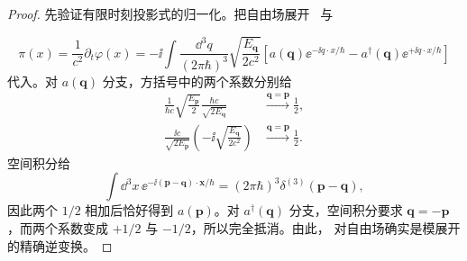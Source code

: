 \begin{proof}
先验证有限时刻投影式的归一化。把自由场展开~ 与

\begin{equation*}
 \pi(x)=\frac{1}{c^2}\partial_t\varphi(x)
 =-\ii\int\frac{\dd^3 q}{(2\pi\hbar)^3}
 \sqrt{\frac{E_{\mathbf q}}{2c^2}}
 \left[
 a(\mathbf q)\ee^{-\ii q\cdot x/\hbar}
 -a^\dagger(\mathbf q)\ee^{+\ii q\cdot x/\hbar}
 \right]
\end{equation*}
代入。对 $a(\mathbf q)$ 分支，方括号中的两个系数分别给
\begin{align*}
 \frac{1}{\hbar c}\sqrt{\frac{E_{\mathbf p}}{2}}
 \frac{\hbar c}{\sqrt{2E_{\mathbf q}}}
 &\xrightarrow{\mathbf q=\mathbf p}\frac12,\\
 \frac{\ii c}{\sqrt{2E_{\mathbf p}}}
 \left(-\ii\sqrt{\frac{E_{\mathbf q}}{2c^2}}\right)
 &\xrightarrow{\mathbf q=\mathbf p}\frac12.
\end{align*}
空间积分给
\begin{equation*}
 \int\dd^3 x\,
 \ee^{-\ii(\mathbf p-\mathbf q)\cdot\mathbf x/\hbar}
 =(2\pi\hbar)^3\delta^{(3)}(\mathbf p-\mathbf q),
\end{equation*}
因此两个 $1/2$ 相加后恰好得到 $a(\mathbf p)$。对 $a^\dagger(\mathbf q)$ 分支，空间积分要求 $\mathbf q=-\mathbf p$，而两个系数变成 $+1/2$ 与 $-1/2$，所以完全抵消。由此， 对自由场确实是模展开的精确逆变换。


\end{proof}
